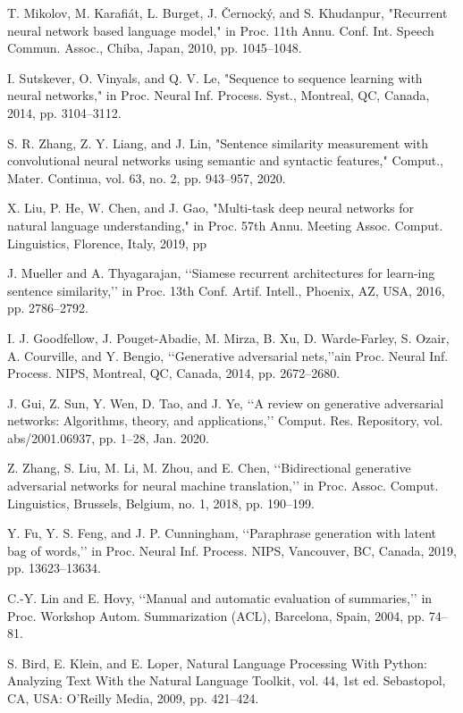 \documentclass[conference]{IEEEtran}
\begin{document}
\begin{thebibliography}{00}
 T. Mikolov, M. Karafiát, L. Burget, J. Černocký, and S. Khudanpur, "Recurrent neural network based language model," in Proc. 11th Annu. Conf. Int. Speech Commun. Assoc., Chiba, Japan, 2010, pp. 1045–1048.

 I. Sutskever, O. Vinyals, and Q. V. Le, "Sequence to sequence learning with neural networks," in Proc. Neural Inf. Process. Syst., Montreal, QC, Canada, 2014, pp. 3104–3112.

 S. R. Zhang, Z. Y. Liang, and J. Lin, "Sentence similarity measurement with convolutional neural networks using semantic and syntactic features," Comput., Mater. Continua, vol. 63, no. 2, pp. 943–957, 2020.

 X. Liu, P. He, W. Chen, and J. Gao, "Multi-task deep neural networks for natural language understanding," in Proc. 57th Annu. Meeting Assoc. Comput. Linguistics, Florence, Italy, 2019, pp

 J. Mueller and A. Thyagarajan, ‘‘Siamese recurrent architectures for learn-ing sentence similarity,’’ in Proc. 13th Conf. Artif. Intell., Phoenix, AZ, USA, 2016, pp. 2786–2792.

I. J. Goodfellow, J. Pouget-Abadie, M. Mirza, B. Xu, D. Warde-Farley, S. Ozair, A. Courville, and Y. Bengio, ‘‘Generative adversarial nets,’’ain Proc. Neural Inf. Process. NIPS, Montreal, QC, Canada, 2014, pp. 2672–2680.

 J. Gui, Z. Sun, Y. Wen, D. Tao, and J. Ye, ‘‘A review on generative adversarial networks: Algorithms, theory, and applications,’’ Comput. Res. Repository, vol. abs/2001.06937, pp. 1–28, Jan. 2020.

 Z. Zhang, S. Liu, M. Li, M. Zhou, and E. Chen, ‘‘Bidirectional generative adversarial networks for neural machine translation,’’ in Proc. Assoc. Comput. Linguistics, Brussels, Belgium, no. 1, 2018, pp. 190–199.

 Y. Fu, Y. S. Feng, and J. P. Cunningham, ‘‘Paraphrase generation with latent bag of words,’’ in Proc. Neural Inf. Process. NIPS, Vancouver, BC, Canada, 2019, pp. 13623–13634.

  C.-Y. Lin and E. Hovy, ‘‘Manual and automatic evaluation of summaries,’’ in Proc. Workshop Autom. Summarization (ACL), Barcelona, Spain, 2004, pp. 74–81.

 S. Bird, E. Klein, and E. Loper, Natural Language Processing With Python: Analyzing Text With the Natural Language Toolkit, vol. 44, 1st ed. Sebastopol, CA, USA: O’Reilly Media, 2009, pp. 421–424.


\end{thebibliography}
\end{document}

